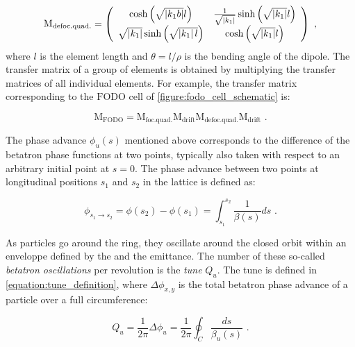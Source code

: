 \begin{equation}
    \mathrm{M_{defoc. quad.}} = \left(
        \begin{array}{cc}
            \cosh \left(\sqrt{\left| k_1b\right|} l \right)          & \frac{1}{\sqrt{\left| k_1 \right|}} \sinh \left( \sqrt{\left| k_1 \right|} l \right) \\
            \sqrt{\left\lvert k_1 \right\rvert} \sinh \left( \sqrt{\left\lvert k_1 \right\rvert l} \right) & \cosh \left( \sqrt{\left\lvert k_1 \right\rvert} l \right)
    \end{array} \right) \text{ ,}
    \label{equation:defocusing_quad_transfer_matrix}
\end{equation}
where \(l\) is the element length and \(\theta = l / \rho\) is the bending angle of the dipole.
The transfer matrix of a group of elements is obtained by multiplying the transfer matrices of all individual elements.
For example, the transfer matrix corresponding to the \(\mathrm{FODO}\) cell of \cref{figure:fodo_cell_schematic} is:

\begin{equation}
    \mathrm{M_{FODO}} = \mathrm{M_{foc. quad.}} \mathrm{M_{drift}} \mathrm{M_{defoc. quad.}} \mathrm{M_{drift}} \text{ .}
    \label{equation:fodo_transfer_matrix}
\end{equation}

The phase advance \(\phi_u(s)\) mentioned above corresponds to the difference of the betatron phase functions at two points, typically also taken with respect to an arbitrary initial point at \(s = 0\).
The phase advance between two points at longitudinal positions \(s_1\) and \(s_2\) in the lattice is defined as:

\begin{equation}
    \phi_{s_1 \rightarrow s_2} = \phi(s_{2}) - \phi(s_{1}) = \int_{s_{1}}^{s_{2}} \frac{1}{\beta(s)} ds \text{ .}
\end{equation}

As particles go around the ring, they oscillate around the closed orbit within an enveloppe defined by the \betafunctions and the emittance.
The number of these so-called \emph{betatron oscillations} per revolution is the \emph{tune} \(Q_u\).
The tune is defined in \cref{equation:tune_definition}, where $\Delta \phi_{x, y}$ is the total betatron phase advance of a particle over a full circumference:

\begin{equation}
    Q_{u} = \frac{1}{2 \pi} \Delta \phi_{u} = \frac{1}{2 \pi} \oint_C \dfrac{ds}{\beta_{u} (s)} \text{ .}
    \label{equation:tune_definition}
\end{equation}

